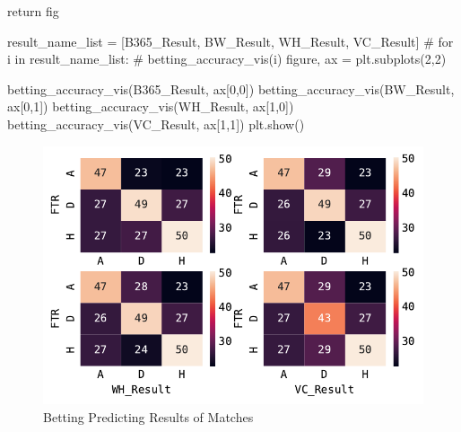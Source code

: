 \documentclass[
  letterpaper,
  DIV=11,
  numbers=noendperiod]{scrartcl}
\newenvironment{Shaded}{\begin{snugshade}}{\end{snugshade}}
\newcommand{\CommentTok}[1]{\textcolor[rgb]{0.37,0.37,0.37}{#1}}
\newcommand{\ControlFlowTok}[1]{\textcolor[rgb]{0.00,0.23,0.31}{#1}}
\newcommand{\DecValTok}[1]{\textcolor[rgb]{0.68,0.00,0.00}{#1}}
\newcommand{\NormalTok}[1]{\textcolor[rgb]{0.00,0.23,0.31}{#1}}
\newcommand{\OperatorTok}[1]{\textcolor[rgb]{0.37,0.37,0.37}{#1}}
\newcommand{\StringTok}[1]{\textcolor[rgb]{0.13,0.47,0.30}{#1}}
\begin{document}
\begin{Shaded}
\begin{Highlighting}[]
    \ControlFlowTok{return}\NormalTok{ fig}

\NormalTok{result\_name\_list }\OperatorTok{=}\NormalTok{ [}\StringTok{\textquotesingle{}B365\_Result\textquotesingle{}}\NormalTok{, }\StringTok{\textquotesingle{}BW\_Result\textquotesingle{}}\NormalTok{, }\StringTok{\textquotesingle{}WH\_Result\textquotesingle{}}\NormalTok{, }\StringTok{\textquotesingle{}VC\_Result\textquotesingle{}}\NormalTok{]}
\CommentTok{\# for i in result\_name\_list:}
\CommentTok{\#     betting\_accuracy\_vis(i)}
\NormalTok{figure, ax }\OperatorTok{=}\NormalTok{ plt.subplots(}\DecValTok{2}\NormalTok{,}\DecValTok{2}\NormalTok{)}

\NormalTok{betting\_accuracy\_vis(}\StringTok{\textquotesingle{}B365\_Result\textquotesingle{}}\NormalTok{, ax[}\DecValTok{0}\NormalTok{,}\DecValTok{0}\NormalTok{])}
\NormalTok{betting\_accuracy\_vis(}\StringTok{\textquotesingle{}BW\_Result\textquotesingle{}}\NormalTok{, ax[}\DecValTok{0}\NormalTok{,}\DecValTok{1}\NormalTok{])}
\NormalTok{betting\_accuracy\_vis(}\StringTok{\textquotesingle{}WH\_Result\textquotesingle{}}\NormalTok{, ax[}\DecValTok{1}\NormalTok{,}\DecValTok{0}\NormalTok{])}
\NormalTok{betting\_accuracy\_vis(}\StringTok{\textquotesingle{}VC\_Result\textquotesingle{}}\NormalTok{, ax[}\DecValTok{1}\NormalTok{,}\DecValTok{1}\NormalTok{])}
\NormalTok{plt.show()}
\end{Highlighting}
\end{Shaded}

\begin{figure}[H]

{\centering \includegraphics{Blog_post_files/figure-pdf/fig-betting_comp-output-1.pdf}

}

\caption{\label{fig-betting_comp}Betting Predicting Results of Matches}

\end{figure}
\end{document}
